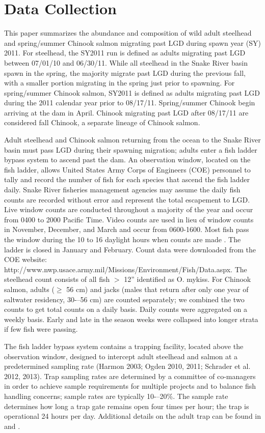 \documentclass[11pt]{article}
\begin{document}
\section{Data Collection}
This paper summarizes the abundance and composition of wild adult steelhead and spring/summer Chinook salmon migrating past LGD during spawn year (SY) 2011. For steelhead, the SY2011 run is defined as adults migrating past LGD between 07/01/10 and 06/30/11. While all steelhead in the Snake River basin spawn in the spring, the majority migrate past LGD during the previous fall, with a smaller portion migrating in the spring just prior to spawning. For spring/summer Chinook salmon, SY2011 is defined as adults migrating past LGD during the 2011 calendar year prior to 08/17/11. Spring/summer Chinook begin arriving at the dam in April. Chinook migrating past LGD after 08/17/11 are considered fall Chinook, a separate lineage of Chinook salmon.

Adult steelhead and Chinook salmon returning from the ocean to the Snake River basin must pass LGD during their spawning migration; adults enter a fish ladder bypass system to ascend past the dam. An observation window, located on the fish ladder, allows United States Army Corps of Engineers (COE) personnel to tally and record the number of fish for each species that ascend the fish ladder daily. Snake River fisheries management agencies may assume the daily fish counts are recorded without error and represent the total escapement to LGD. Live window counts are conducted throughout a majority of the year and occur from 0400 to 2000 Pacific Time. Video counts are used in lieu of window counts in November, December, and March and occur from 0600-1600. Most fish pass the window during the 10 to 16 daylight hours when counts are made \cite{Cassinelli2012}. The ladder is closed in January and February. Count data were downloaded from the COE website: http://www.nwp.usace.army.mil/Missions/Environment/Fish/Data.aspx. The steelhead count consists of all fish $>$ 12'' identified as O. mykiss. For Chinook salmon, adults ($\geq$ 56 cm) and jacks (males that return after only one year of saltwater residency, 30-–56 cm) are counted separately; we combined the two counts to get total counts on a daily basis. Daily counts were aggregated on a weekly basis. Early and late in the season weeks were collapsed into longer strata if few fish were passing.
 
The fish ladder bypass system contains a trapping facility, located above the observation window, designed to intercept adult steelhead and salmon at a predetermined sampling rate (Harmon 2003; Ogden 2010, 2011; Schrader et al. 2012, 2013). Trap sampling rates are determined by a committee of co-managers in order to achieve sample requirements for multiple projects and to balance fish handling concerns; sample rates are typically 10-–20\%. The sample rate determines how long a trap gate remains open four times per hour; the trap is operational 24 hours per day. Additional details on the adult trap can be found in  and .
\end{document}
